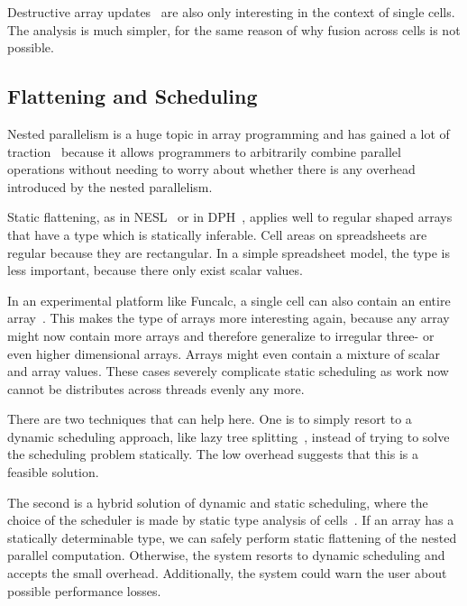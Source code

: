\documentclass[a4paper]{article}
\begin{document}
Destructive array updates~\cite{Sastry:1994:PDU:182409.182486} are also only interesting in the context of single cells. The analysis is much simpler, for the same reason of why fusion across cells is not possible.

\subsection{Flattening and Scheduling}
\label{sec:scheduling}

Nested parallelism is a huge topic in array programming and has gained a lot of traction~\cite{Blelloch1993Implementation, Lippmeier:2012:WEH:2364527.2364564, Collins:2014:NFL:2627373.2627375} because it allows programmers to arbitrarily combine parallel operations without needing to worry about whether there is any overhead introduced by the nested parallelism.

Static flattening, as in NESL~\cite{Blelloch1993Implementation} or in DPH~\cite{Lippmeier:2012:WEH:2364527.2364564}, applies well to regular shaped arrays that have a type which is statically inferable. Cell areas on spreadsheets are regular because they are rectangular. In a simple spreadsheet model, the type is less important, because there only exist scalar values.

In an experimental platform like Funcalc, a single cell can also contain an entire array~\cite{Jones:2003:UAF:944705.944721, Sestoft2014Spreadsheet}. This makes the type of arrays more interesting again, because any array might now contain more arrays and therefore generalize to irregular three- or even higher dimensional arrays. Arrays might even contain a mixture of scalar and array values. These cases severely complicate static scheduling as work now cannot be distributes across threads evenly any more.

There are two techniques that can help here. One is to simply resort to a dynamic scheduling approach, like lazy tree splitting~\cite{Bergstrom:2010:LTS:1863543.1863558}, instead of trying to solve the scheduling problem statically. The low overhead suggests that this is a feasible solution.

The second is a hybrid solution of dynamic and static scheduling, where the choice of the scheduler is made by static type analysis of cells~\cite{Abraham:2006:TIS:1140335.1140346, Cheng2012Abstract, Cheng2015Static}. If an array has a statically determinable type, we can safely perform static flattening of the nested parallel computation. Otherwise, the system resorts to dynamic scheduling and accepts the small overhead. Additionally, the system could warn the user about possible performance losses.
\end{document}
